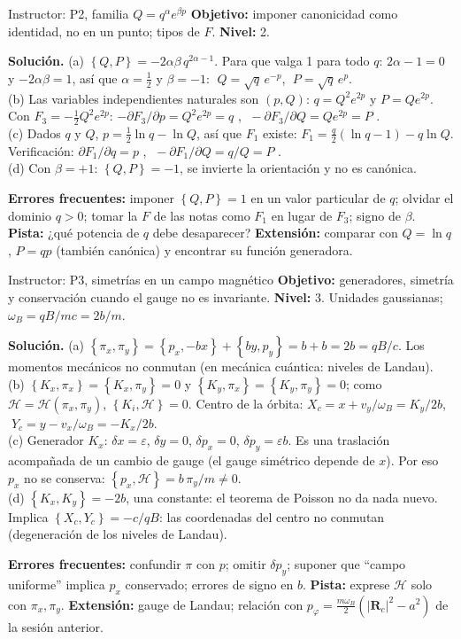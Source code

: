 \documentclass[spanish]{beamer}
\newcommand{\Ham}{\mathcal{H}}               %
\newcommand{\pb}[2]{\left\{#1,#2\right\}}    %
\begin{document}
\begin{frame}{Instructor: P2, familia $Q=q^\alpha e^{\beta p}$}
\scriptsize
\textbf{Objetivo:} imponer canonicidad como identidad, no en un punto; tipos de $F$.
\textbf{Nivel:} 2.

\textbf{Solución.} (a) $\pb{Q}{P}=-2\alpha\beta\,q^{2\alpha-1}$. Para que valga 1 para todo $q$:
$2\alpha-1=0$ y $-2\alpha\beta=1$, así que $\alpha=\tfrac12$ y $\beta=-1$:
$\;Q=\sqrt q\,e^{-p}$, $\;P=\sqrt q\,e^{p}$.
\\(b) Las variables independientes naturales son $(p,Q)$: $q=Q^2e^{2p}$ y $P=Qe^{2p}$.
Con $F_3=-\tfrac12Q^2e^{2p}$: $-\partial F_3/\partial p=Q^2e^{2p}=q$ \checkmark,
$\;-\partial F_3/\partial Q=Qe^{2p}=P$ \checkmark.
\\(c) Dados $q$ y $Q$, $p=\tfrac12\ln q-\ln Q$, así que $F_1$ existe:
$F_1=\tfrac q2(\ln q-1)-q\ln Q$. Verificación: $\partial F_1/\partial q=p$ \checkmark,
$\;-\partial F_1/\partial Q=q/Q=P$ \checkmark.
\\(d) Con $\beta=+1$: $\pb{Q}{P}=-1$, se invierte la orientación y no es canónica.

\medskip
\textbf{Errores frecuentes:} imponer $\pb{Q}{P}=1$ en un valor particular de $q$;
olvidar el dominio $q>0$; tomar la $F$ de las notas como $F_1$ en lugar de $F_3$;
signo de $\beta$.
\textbf{Pista:} ¿qué potencia de $q$ debe desaparecer?
\textbf{Extensión:} comparar con $Q=\ln q$, $P=qp$ (también canónica) y encontrar
su función generadora.
\end{frame}

\begin{frame}{Instructor: P3, simetrías en un campo magnético}
\scriptsize
\textbf{Objetivo:} generadores, simetría y conservación cuando el gauge no es invariante.
\textbf{Nivel:} 3. Unidades gaussianas; $\omega_B=qB/mc=2b/m$.

\textbf{Solución.} (a) $\pb{\pi_x}{\pi_y}=\pb{p_x}{-bx}+\pb{by}{p_y}=b+b=2b=qB/c$.
Los momentos mecánicos no conmutan (en mecánica cuántica: niveles de Landau).
\\(b) $\pb{K_x}{\pi_x}=\pb{K_x}{\pi_y}=0$ y $\pb{K_y}{\pi_x}=\pb{K_y}{\pi_y}=0$; como
$\Ham=\Ham(\pi_x,\pi_y)$, $\pb{K_i}{\Ham}=0$. Centro de la órbita:
$X_c=x+v_y/\omega_B=K_y/2b$, $\;Y_c=y-v_x/\omega_B=-K_x/2b$.
\\(c) Generador $K_x$: $\delta x=\varepsilon$, $\delta y=0$, $\delta p_x=0$, $\delta p_y=\varepsilon b$.
Es una traslación acompañada de un cambio de gauge (el gauge simétrico depende de $x$).
Por eso $p_x$ no se conserva: $\pb{p_x}{\Ham}=b\,\pi_y/m\neq0$.
\\(d) $\pb{K_x}{K_y}=-2b$, una constante: el teorema de Poisson no da nada nuevo.
Implica $\pb{X_c}{Y_c}=-c/qB$: las coordenadas del centro no conmutan
(degeneración de los niveles de Landau).

\medskip
\textbf{Errores frecuentes:} confundir $\pi$ con $p$; omitir $\delta p_y$; suponer que
“campo uniforme” implica $p_x$ conservado; errores de signo en $b$.
\textbf{Pista:} exprese $\Ham$ solo con $\pi_x,\pi_y$.
\textbf{Extensión:} gauge de Landau; relación con
$p_\varphi=\tfrac{m\omega_B}{2}(|\mathbf R_c|^2-a^2)$ de la sesión anterior.
\end{frame}
\end{document}
